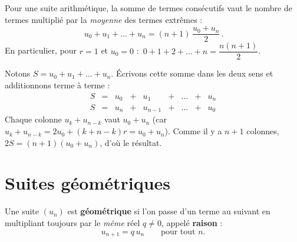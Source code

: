 \begin{theoreme}
Pour une suite arithmétique, la somme de termes consécutifs vaut le nombre de termes
multiplié par la \emph{moyenne} des termes extrêmes :
\[ \boxed{\,u_0+u_1+\dots+u_n=(n+1)\,\dfrac{u_0+u_n}{2}\,}. \]
En particulier, pour $r=1$ et $u_0=0$ : $\,0+1+2+\dots+n=\dfrac{n(n+1)}{2}$.
\end{theoreme}

\begin{exemple}[Démonstration]
Notons $S=u_0+u_1+\dots+u_n$. Écrivons cette somme dans les deux sens et additionnons
terme à terme :
\[
\begin{array}{rcccccccl}
S &=& u_0 &+& u_1 &+&\dots&+& u_n\\
S &=& u_n &+& u_{n-1} &+&\dots&+& u_0
\end{array}
\]
Chaque colonne $u_k+u_{n-k}$ vaut $u_0+u_n$ (car $u_k+u_{n-k}=2u_0+(k+n-k)r=u_0+u_n$).
Comme il y a $n+1$ colonnes, $2S=(n+1)(u_0+u_n)$, d'où le résultat.
\end{exemple}

\begin{illus}
\end{illus}

\section{Suites géométriques}

\begin{definition}
Une suite $(u_n)$ est \textbf{géométrique} si l'on passe d'un terme au suivant en
multipliant toujours par le \emph{même} réel $q\neq 0$, appelé \textbf{raison} :
\[ u_{n+1}=q\,u_n \qquad \text{pour tout } n. \]
\end{definition}

